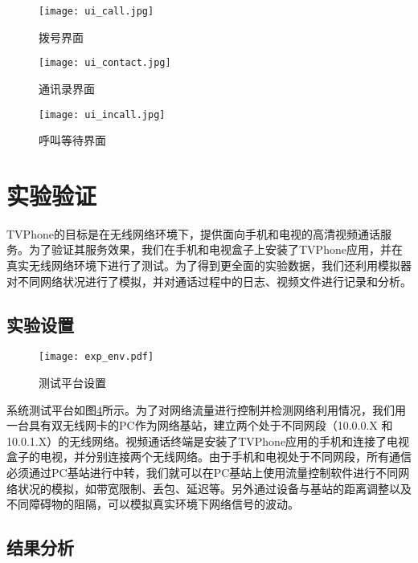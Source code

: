 \begin{figure}[htbp]
  \centering
  \texttt{[image: ui\_call.jpg]}
  \caption{拨号界面}
  \label{fig:ui_call}
\end{figure}

\begin{figure}[htbp]
  \centering
  \texttt{[image: ui\_contact.jpg]}
  \caption{通讯录界面}
  \label{fig:ui_contact}
\end{figure}

\begin{figure}[htbp]
  \centering
  \texttt{[image: ui\_incall.jpg]}
  \caption{呼叫等待界面}
  \label{fig:ui_incall}
\end{figure}

\section{实验验证}

TVPhone的目标是在无线网络环境下，提供面向手机和电视的高清视频通话服务。为了验证其服务效果，我们在手机和电视盒子上安装了TVPhone应用，并在真实无线网络环境下进行了测试。为了得到更全面的实验数据，我们还利用模拟器对不同网络状况进行了模拟，并对通话过程中的日志、视频文件进行记录和分析。

\subsection{实验设置}
\begin{figure}[htbp]
  \centering
  \texttt{[image: exp\_env.pdf]}
  \caption{测试平台设置}
  \label{fig:exp_env}
\end{figure}

系统测试平台如图\ref{fig:exp_env}所示。为了对网络流量进行控制并检测网络利用情况，我们用一台具有双无线网卡的PC作为网络基站，建立两个处于不同网段（10.0.0.X 和10.0.1.X）的无线网络。视频通话终端是安装了TVPhone应用的手机和连接了电视盒子的电视，并分别连接两个无线网络。由于手机和电视处于不同网段，所有通信必须通过PC基站进行中转，我们就可以在PC基站上使用流量控制软件进行不同网络状况的模拟，如带宽限制、丢包、延迟等。另外通过设备与基站的距离调整以及不同障碍物的阻隔，可以模拟真实环境下网络信号的波动。


\subsection{结果分析}

